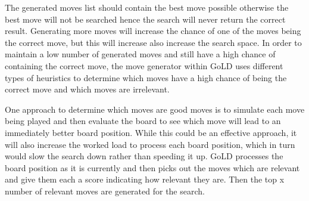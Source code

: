 \documentclass{l4proj}
\begin{document}
The generated moves list should contain the best move possible otherwise the best move will not be searched hence the search will never return the correct result. Generating more moves will increase the chance of one of the moves being the correct move, but this will increase also increase the search space. In order to maintain a low number of generated moves and still have a high chance of containing the correct move, the move generator within GoLD uses different types of heuristics to determine which moves have a high chance of being the correct move and which moves are irrelevant.

One approach to determine which moves are good moves is to simulate each move being played and then evaluate the board to see which move will lead to an immediately better board position. While this could be an effective approach, it will also increase the worked load to process each board position, which in turn would slow the search down rather than speeding it up. GoLD processes the board position as it is currently and then picks out the moves which are relevant and give them each a score indicating how relevant they are. Then the top x number of relevant moves are generated for the search.
\end{document}
